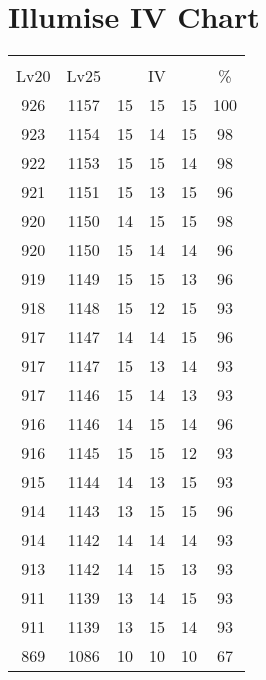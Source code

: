 \documentclass{article}%
\begin{document}
%
\normalsize%
\section{Illumise IV Chart}%
\label{sec:Illumise IV Chart}%
\renewcommand{\arraystretch}{1.5}%
\begin{tabular}{|c|c|c|c|c|c|}%
\hline%
\multicolumn{6}{|c|}{\textcolor{white}{ 
\linebreak{Illumise}
}%
\cellcolor{black}}\\%
\multicolumn{1}{|c}{Lv20}&\multicolumn{1}{c|}{Lv25}&\multicolumn{3}{c|}{IV}&\multicolumn{1}{|c|}{\%}\\%
\hline%
\rowcolor{color100}%
926&1157&15&15&15&100\\%
\hline%
\rowcolor{color98}%
923&1154&15&14&15&98\\%
\hline%
\rowcolor{color98}%
922&1153&15&15&14&98\\%
\hline%
\rowcolor{color96}%
921&1151&15&13&15&96\\%
\hline%
\rowcolor{color98}%
920&1150&14&15&15&98\\%
\hline%
\rowcolor{color96}%
920&1150&15&14&14&96\\%
\hline%
\rowcolor{color96}%
919&1149&15&15&13&96\\%
\hline%
\rowcolor{color93}%
918&1148&15&12&15&93\\%
\hline%
\rowcolor{color96}%
917&1147&14&14&15&96\\%
\hline%
\rowcolor{color93}%
917&1147&15&13&14&93\\%
\hline%
\rowcolor{color93}%
917&1146&15&14&13&93\\%
\hline%
\rowcolor{color96}%
916&1146&14&15&14&96\\%
\hline%
\rowcolor{color93}%
916&1145&15&15&12&93\\%
\hline%
\rowcolor{color93}%
915&1144&14&13&15&93\\%
\hline%
\rowcolor{color96}%
914&1143&13&15&15&96\\%
\hline%
\rowcolor{color93}%
914&1142&14&14&14&93\\%
\hline%
\rowcolor{color93}%
913&1142&14&15&13&93\\%
\hline%
\rowcolor{color93}%
911&1139&13&14&15&93\\%
\hline%
\rowcolor{color93}%
911&1139&13&15&14&93\\%
\hline%
\rowcolor{color91}%
869&1086&10&10&10&67\\%
\end{tabular}

%
\end{document}

